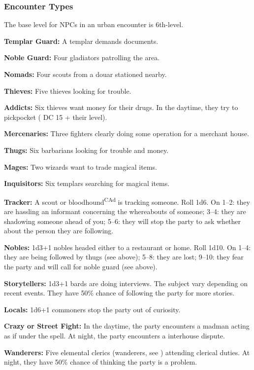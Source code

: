 \subsubsection{Encounter Types}
The base level for NPCs in an urban encounter is 6th-level.

\textbf{Templar Guard:} A templar demands documents.

\textbf{Noble Guard:} Four gladiators patrolling the area.

\textbf{Nomads:} Four scouts from a douar stationed nearby.

\textbf{Thieves:} Five thieves looking for trouble.

\textbf{Addicts:} Six thieves want money for their drugs. In the daytime, they try to pickpocket ( DC 15 + \onehalf their level).

\textbf{Mercenaries:} Three fighters clearly doing some operation for a merchant house.

\textbf{Thugs:} Six barbarians looking for trouble and money.

\textbf{Mages:} Two wizards want to trade magical items.

\textbf{Inquisitors:} Six templars searching for magical items.

\textbf{Tracker:} A scout or bloodhound\textsuperscript{CAd} is tracking someone. Roll 1d6. On 1--2: they are hassling an informant concerning the whereabouts of someone; 3--4: they are shadowing someone ahead of you; 5--6: they will stop the party to ask whether about the person they are following.

\textbf{Nobles:} 1d3+1 nobles headed either to a restaurant or home. Roll 1d10. On 1--4: they are being followed by thugs (see above); 5--8: they are lost; 9--10: they fear the party and will call for noble guard (see above).

\textbf{Storytellers:} 1d3+1 bards are doing interviews. The subject vary depending on recent events. They have 50\% chance of following the party for more stories.

\textbf{Locals:} 1d6+1 commoners stop the party out of curiosity.

\textbf{Crazy or Street Fight:} In the daytime, the party encounters a madman acting as if under the  spell. At night, the party encounters a interhouse dispute.

\textbf{Wanderers:} Five elemental clerics (wanderers, see ) attending clerical duties. At night, they have 50\% chance of thinking the party is a problem.

